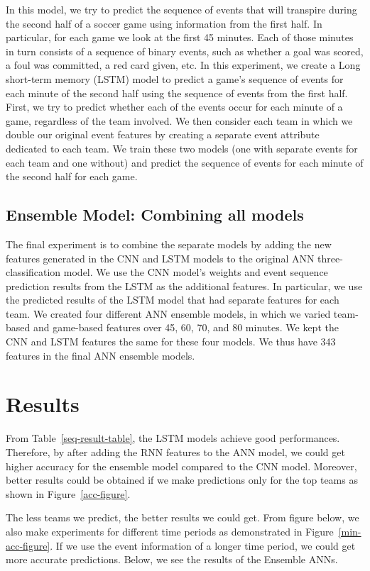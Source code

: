 \documentclass[11pt,a4paper]{article}
\begin{document}
In this model, we try to predict the sequence of events that will transpire during the second half of a soccer game using information from the first half. In particular, for each game we look at the first 45 minutes. Each of those minutes in turn consists of a sequence of binary events, such as whether a goal was scored, a foul was committed, a red card given, etc. In this experiment, we create a Long short-term memory (LSTM) model to predict a game’s sequence of events for each minute of the second half using the sequence of events from the first half. First, we try to predict whether each of the events occur for each minute of a game, regardless of the team involved. We then consider each team in which we double our original event features by creating a separate event attribute dedicated to each team. We train these two models (one with separate events for each team and one without) and predict the sequence of events for each minute of the second half for each game.

\subsection{Ensemble Model: Combining all models}

The final experiment is to combine the separate models by adding the new features generated in the CNN and LSTM models to the original ANN three-classification model. We use the CNN model’s weights and event sequence prediction results from the LSTM as the additional features. In particular, we use the predicted results of the LSTM model that had separate features for each team. We created four different ANN ensemble models, in which we varied team-based and game-based features over 45, 60, 70, and 80 minutes. We kept the CNN and LSTM features the same for these four models. We thus have 343 features in the final ANN ensemble models.

\section{Results}

From Table~\ref{seq-result-table}, the LSTM models achieve good performances. Therefore, by after adding the RNN features to the ANN model, we could get higher accuracy for the ensemble model compared to the CNN model. Moreover, better results could be obtained if we make predictions only for the top teams as shown in Figure~\ref{acc-figure}.

The less teams we predict, the better results we could get. From figure below, we also make experiments for different time periods as demonstrated in Figure~\ref{min-acc-figure}. If we use the event information of a longer time period, we could get more accurate predictions. Below, we see the results of the Ensemble ANNs.
\end{document}
